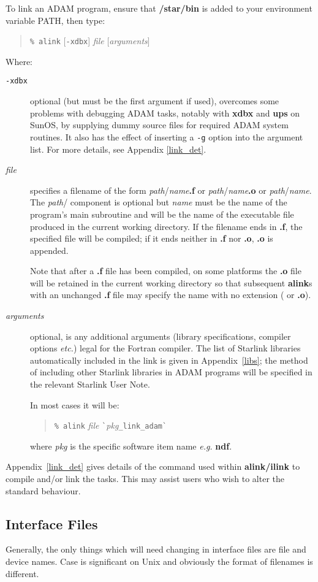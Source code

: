 To link an ADAM program, ensure that {\bf /star/bin} is added to your 
environment variable PATH, then type:
\begin{quote} 
\verb!% alink! [\verb!-xdbx!] {\em file} [{\em arguments}]
\end{quote}
Where:
\begin{description}
\item[\verb!-xdbx!] optional (but must be the first argument if used), 
overcomes some problems with debugging ADAM tasks, notably with {\bf xdbx} 
and {\bf ups} on SunOS, by supplying dummy source files for required ADAM 
system routines. It also has the effect of inserting a \verb!-g! option into 
the argument list. For more details, see Appendix \ref{link_det}.
\item[{\em file}] specifies a filename of the form 
{\em path}/{\em name}{\bf .f} or {\em path}/{\em name}{\bf .o} or 
{\em path}/{\em name}. The {\em path}/ component is optional but
{\em name} must be the name of the program's main subroutine and will
be the name of the executable file produced in the current working directory.
If the filename ends in {\bf .f}, the specified file will be compiled; if it
ends neither in {\bf .f} nor {\bf .o}, {\bf .o} is appended.

Note that after a {\bf .f} file has been compiled, on some platforms the 
{\bf .o} file will be retained in the current working directory so that 
subsequent {\bf alink}s with an unchanged {\bf .f} file may specify the name
with no extension ( or {\bf .o}).
\item[{\em arguments}] optional, is any additional arguments (library 
specifications, compiler options {\em etc.}) legal for the Fortran 
compiler.
The list of Starlink libraries automatically included in the link is given in 
Appendix~\ref{libs}; the method of including other Starlink libraries in ADAM
programs will be specified in the relevant Starlink User Note.

In most cases it will be:
\begin{quote}
\verb!% alink! {\em file} \verb!`!{\em pkg}\verb!_link_adam`!
\end{quote}
where {\em pkg} is the specific software item name {\em e.g.} {\bf ndf}.
\end{description}

Appendix~\ref{link_det} gives details of the command used within 
{\bf alink/ilink} to compile and/or link the tasks. 
This may assist users who wish to alter the standard behaviour.

\subsection{Interface Files}
Generally, the only things which will need changing in interface files are
file and device names. Case is significant on Unix and obviously the format of 
filenames is different.

